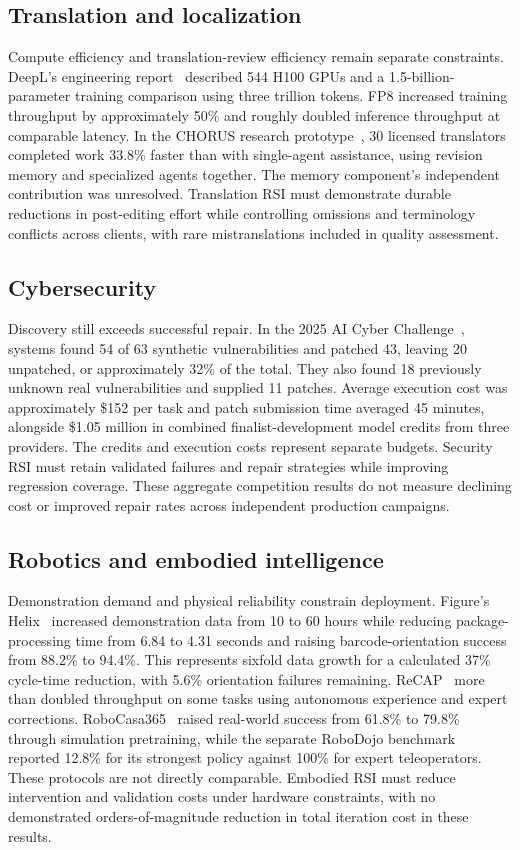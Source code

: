 \subsection{Translation and localization}
Compute efficiency and translation-review efficiency remain separate constraints. DeepL's engineering report~\cite{deepl2025fp8} described 544 H100 GPUs and a 1.5-billion-parameter training comparison using three trillion tokens. FP8 increased training throughput by approximately 50\% and roughly doubled inference throughput at comparable latency. In the CHORUS research prototype~\cite{wang2026chorus}, 30 licensed translators completed work 33.8\% faster than with single-agent assistance, using revision memory and specialized agents together. The memory component's independent contribution was unresolved. Translation RSI must demonstrate durable reductions in post-editing effort while controlling omissions and terminology conflicts across clients, with rare mistranslations included in quality assessment.

\subsection{Cybersecurity}
Discovery still exceeds successful repair. In the 2025 AI Cyber Challenge~\cite{darpa2025aixcc}, systems found 54 of 63 synthetic vulnerabilities and patched 43, leaving 20 unpatched, or approximately 32\% of the total. They also found 18 previously unknown real vulnerabilities and supplied 11 patches. Average execution cost was approximately \$152 per task and patch submission time averaged 45 minutes, alongside \$1.05 million in combined finalist-development model credits from three providers. The credits and execution costs represent separate budgets. Security RSI must retain validated failures and repair strategies while improving regression coverage. These aggregate competition results do not measure declining cost or improved repair rates across independent production campaigns.

\subsection{Robotics and embodied intelligence}
Demonstration demand and physical reliability constrain deployment. Figure's Helix~\cite{figure2025helix} increased demonstration data from 10 to 60 hours while reducing package-processing time from 6.84 to 4.31 seconds and raising barcode-orientation success from 88.2\% to 94.4\%. This represents sixfold data growth for a calculated 37\% cycle-time reduction, with 5.6\% orientation failures remaining. ReCAP~\cite{physicalintelligence2025recap} more than doubled throughput on some tasks using autonomous experience and expert corrections. RoboCasa365~\cite{nasiriany2026robocasa} raised real-world success from 61.8\% to 79.8\% through simulation pretraining, while the separate RoboDojo benchmark~\cite{robodojo2026benchmark} reported 12.8\% for its strongest policy against 100\% for expert teleoperators. These protocols are not directly comparable. Embodied RSI must reduce intervention and validation costs under hardware constraints, with no demonstrated orders-of-magnitude reduction in total iteration cost in these results.
\fi
